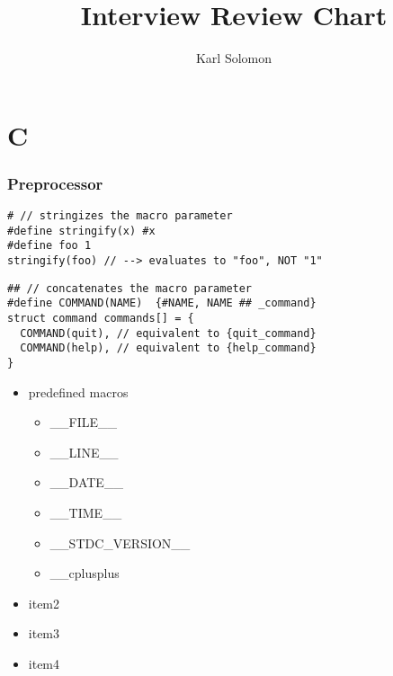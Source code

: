 \documentclass{article}
\begin{document}
\selectfont
\title{Interview Review Chart}
\author{Karl Solomon}
\maketitle
\tableofcontents
\part{C}
\section{Preprocessor}
\begin{lstlisting}[style=cpp]
# // stringizes the macro parameter
#define stringify(x) #x
#define foo 1
stringify(foo) // --> evaluates to "foo", NOT "1"
\end{lstlisting}

\begin{lstlisting}[style=cpp]
## // concatenates the macro parameter
#define COMMAND(NAME)  {#NAME, NAME ## _command}
struct command commands[] = {
  COMMAND(quit), // equivalent to {quit_command}
  COMMAND(help), // equivalent to {help_command}
}
\end{lstlisting}

\begin{itemize}
	\item predefined macros
	      \begin{itemize}
		      \item \_\_FILE\_\_
		      \item \_\_LINE\_\_
		      \item \_\_DATE\_\_
		      \item \_\_TIME\_\_
		      \item \_\_STDC\_VERSION\_\_
		      \item \_\_cplusplus
	      \end{itemize}
	\item item2
	\item item3
	\item item4
\end{itemize}
\end{document}
